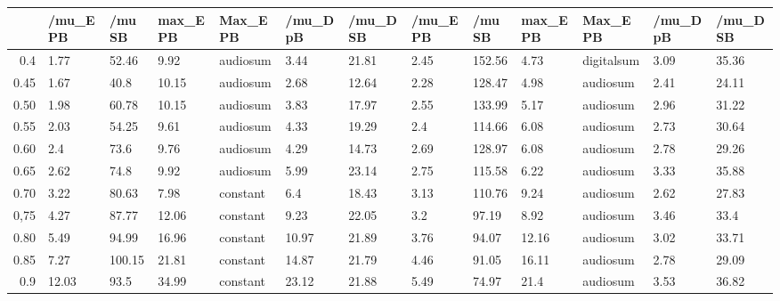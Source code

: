 \begin{table}[ht]
\centering
\begin{tabular}{rllllllllllll}
  \hline
 & /mu\_E PB & /mu SB & max\_E PB & Max\_E PB & /mu\_D pB & /mu\_D SB & /mu\_E PB & /mu SB & max\_E PB & Max\_E PB & /mu\_D pB & /mu\_D SB \\ 
  \hline
0.4 & 1.77 & 52.46 & 9.92 & audiosum & 3.44 & 21.81 & 2.45 & 152.56 & 4.73 & digitalsum & 3.09 & 35.36 \\ 
  0.45 & 1.67 & 40.8 & 10.15 & audiosum & 2.68 & 12.64 & 2.28 & 128.47 & 4.98 & audiosum & 2.41 & 24.11 \\ 
  0.50 & 1.98 & 60.78 & 10.15 & audiosum & 3.83 & 17.97 & 2.55 & 133.99 & 5.17 & audiosum & 2.96 & 31.22 \\ 
  0.55 & 2.03 & 54.25 & 9.61 & audiosum & 4.33 & 19.29 & 2.4 & 114.66 & 6.08 & audiosum & 2.73 & 30.64 \\ 
  0.60 & 2.4 & 73.6 & 9.76 & audiosum & 4.29 & 14.73 & 2.69 & 128.97 & 6.08 & audiosum & 2.78 & 29.26 \\ 
  0.65 & 2.62 & 74.8 & 9.92 & audiosum & 5.99 & 23.14 & 2.75 & 115.58 & 6.22 & audiosum & 3.33 & 35.88 \\ 
  0.70 & 3.22 & 80.63 & 7.98 & constant & 6.4 & 18.43 & 3.13 & 110.76 & 9.24 & audiosum & 2.62 & 27.83 \\ 
  0,75 & 4.27 & 87.77 & 12.06 & constant & 9.23 & 22.05 & 3.2 & 97.19 & 8.92 & audiosum & 3.46 & 33.4 \\ 
  0.80 & 5.49 & 94.99 & 16.96 & constant & 10.97 & 21.89 & 3.76 & 94.07 & 12.16 & audiosum & 3.02 & 33.71 \\ 
  0.85 & 7.27 & 100.15 & 21.81 & constant & 14.87 & 21.79 & 4.46 & 91.05 & 16.11 & audiosum & 2.78 & 29.09 \\ 
  0.9 & 12.03 & 93.5 & 34.99 & constant & 23.12 & 21.88 & 5.49 & 74.97 & 21.4 & audiosum & 3.53 & 36.82 \\ 
   \hline
\end{tabular}
\end{table}
